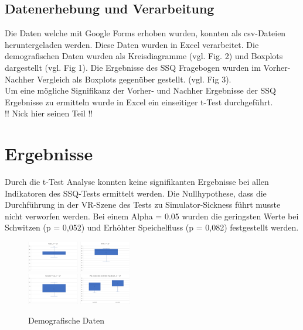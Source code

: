 \documentclass[conference]{IEEEtran}
\begin{document}
\subsection{Datenerhebung und Verarbeitung}
Die Daten welche mit Google Forms erhoben wurden, konnten als csv-Dateien heruntergeladen werden. Diese Daten wurden in Excel verarbeitet. Die demografischen Daten wurden als Kreisdiagramme (vgl. Fig. 2) und Boxplots dargestellt (vgl. Fig 1).
Die Ergebnisse des SSQ Fragebogen wurden im Vorher-Nachher Vergleich als Boxplots gegenüber gestellt. (vgl. Fig 3).\\
Um eine mögliche Signifikanz der Vorher- und Nachher Ergebnisse der SSQ Ergebnisse zu ermitteln wurde in Excel ein einseitiger t-Test durchgeführt.\\ 
!! Nick hier seinen Teil !!

\section{Ergebnisse}
Durch die t-Test Analyse konnten keine signifikanten Ergebnisse bei allen Indikatoren des SSQ-Tests ermittelt werden. Die Nullhypothese, dass die Durchführung in der VR-Szene des Tests zu Simulator-Sickness führt musste nicht verworfen werden. Bei einem Alpha = 0.05 wurden die geringsten Werte bei Schwitzen (p = 0,052) und Erhöhter Speichelfluss (p = 0,082) festgestellt werden.\\
\begin{figure}[ht]
	\centering
	\includegraphics[width=0.2\textwidth]{assets/alter.png} \hspace{-5pt}
	\includegraphics[width=0.2\textwidth]{assets/ipd.png} \\
	\vspace{2pt}
	\includegraphics[width=0.2\textwidth]{assets/randot.png} \hspace{-5pt}
	\includegraphics[width=0.2\textwidth]{assets/ipd_mvw.png}\\
	\caption{Demografische Daten}
	\label{fig:Demografische Daten}
\end{figure}
\end{document}
